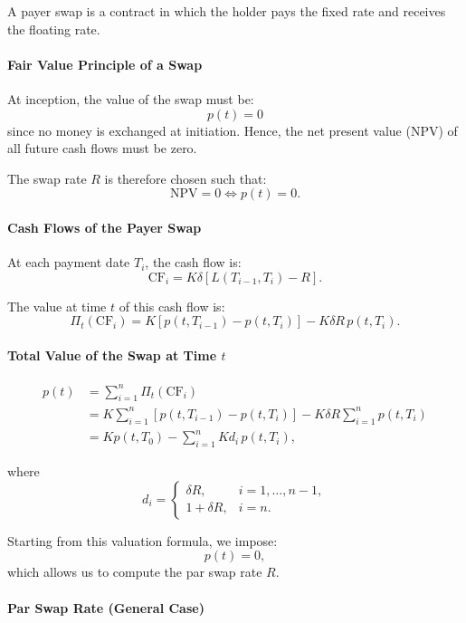 \documentclass[12pt,a4paper]{article}
\theoremstyle{definition}
\begin{document}
A payer swap is a contract in which the holder pays the fixed rate and receives the floating rate.


\paragraph{Fair Value Principle of a Swap}

At inception, the value of the swap must be:
\[
p(t) = 0
\]
since no money is exchanged at initiation. Hence, the net present value (NPV) of all future cash flows must be zero.

The swap rate $R$ is therefore chosen such that:
\[
\text{NPV} = 0 \iff p(t) = 0.
\]

\paragraph{Cash Flows of the Payer Swap}

At each payment date $T_i$, the cash flow is:
\[
\text{CF}_i = K\delta[L(T_{i-1}, T_i) - R].
\]

The value at time $t$ of this cash flow is:
\[
\Pi_t(\text{CF}_i) = K[p(t, T_{i-1}) - p(t, T_i)] - K\delta R \, p(t, T_i).
\]

\paragraph{Total Value of the Swap at Time $t$}

\begin{align*}
p(t) &= \sum_{i=1}^n \Pi_t(\text{CF}_i) \\
&= K \sum_{i=1}^n [p(t, T_{i-1}) - p(t, T_i)] - K\delta R \sum_{i=1}^n p(t, T_i) \\
&= K p(t, T_0) - \sum_{i=1}^n K d_i \, p(t, T_i),
\end{align*}

where
\[
d_i = \begin{cases}
\delta R, & i = 1, \ldots, n-1, \\
1 + \delta R, & i = n.
\end{cases}
\]

Starting from this valuation formula, we impose:
\[
p(t) = 0,
\]
which allows us to compute the par swap rate $R$.

\paragraph{Par Swap Rate (General Case)}
\end{document}
